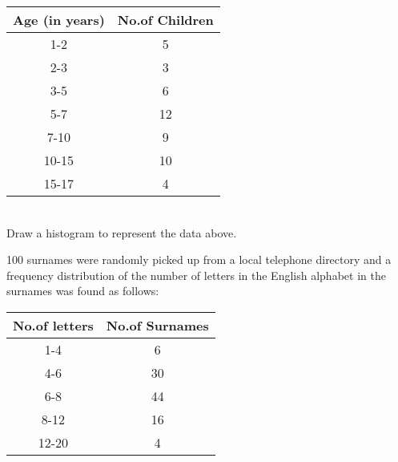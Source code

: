 \begin{tabular}{|c|c|}
\hline
\textbf{Age (in years)} &\textbf{No.of Children}\\
\hline
1-2 &5\\
2-3 &3\\
3-5 &6\\
5-7 &12\\
7-10 &9\\
10-15 &10\\
15-17 &4\\
\hline
\end{tabular}\\

Draw a histogram to represent the data above.\\
\item 100 surnames were randomly picked up from a local telephone directory and a frequency distribution of the number of letters in the English alphabet in the surnames was found as follows:\\

\begin{tabular}{|c|c|}
\hline
\textbf{No.of letters} &\textbf{No.of Surnames}\\
\hline
1-4 &6\\
4-6 &30\\
6-8 &44\\
8-12 &16\\
12-20 &4\\
\hline
\end{tabular}\\

